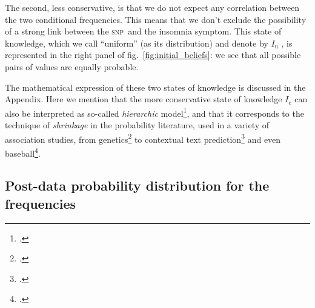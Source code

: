 \documentclass[\ifafour a4paper,12pt,\else a5paper,10pt,\fi%
onecolumn,oneside,article,%
british%
]{memoir}
\theoremstyle{remark}
\theoremstyle{innote}
\newcommand*{\citep}{\footcites}
\renewcommand*{\|}[1][]{\nonscript\,#1\vert\nonscript\;\mathopen{}}
\newcommand*{\fig}{fig.}%
\newcommand*{\snp}{\textsc{snp}}
\newcommand*{\yI}{I}
\newcommand*{\yIu}{\yI_\text{u}}
\newcommand*{\yIc}{\yI_\text{c}}
\begin{document}
The second, less conservative, is that we do not expect any correlation
between the two conditional frequencies. This means that we don't exclude
the possibility of a strong link between the \snp\ and the insomnia
symptom. This state of knowledge, which we call \enquote{uniform} (as its
distribution) and denote by $\yIu$ , is represented in the right panel of
\fig~\ref{fig:initial_beliefs}: we see that all possible pairs of values
are equally probable.

The mathematical expression of these two states of knowledge is discussed in
the Appendix. Here we mention that the more conservative state of knowledge
$\yIc$ can also be interpreted as so-called \emph{hierarchic}
model\citep[for example][]{good1980}, and that it corresponds to the
technique of \emph{shrinkage} in the probability literature, used in a
variety of association studies, from
genetics\citep{lange1995,lockwoodetal2001} to contextual text
prediction\citep{mackayetal1995} and even baseball\citep{jiangetal2010}.

\subsection{Post-data probability distribution for the frequencies}
\label{sec:p_final}
\end{document}
